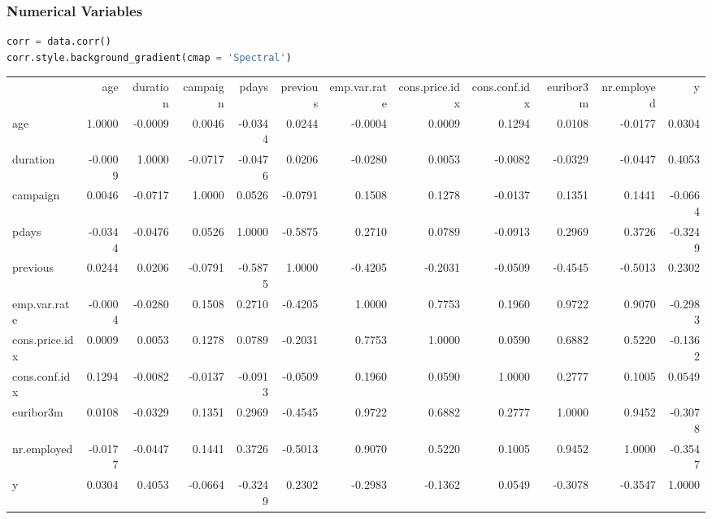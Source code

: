 \documentclass[11pt,a4paper]{article}
\begin{document}
    \subsubsection{Numerical Variables}
\begin{lstlisting}[language = Python]
corr = data.corr()
corr.style.background_gradient(cmap = 'Spectral')
\end{lstlisting}
    \noindent
    {\tiny
        \begin{tabular}{lrrrrrrrrrrr}
            {} &     age &  duration &  campaign &   pdays &  previous &  emp.var.rate &  cons.price.idx &  cons.conf.idx &  euribor3m &  nr.employed &       y \\
            
            age            &  1.0000 &   -0.0009 &    0.0046 & -0.0344 &    0.0244 &       -0.0004 &          0.0009 &         0.1294 &     0.0108 &      -0.0177 &  0.0304 \\
            duration       & -0.0009 &    1.0000 &   -0.0717 & -0.0476 &    0.0206 &       -0.0280 &          0.0053 &        -0.0082 &    -0.0329 &      -0.0447 &  0.4053 \\
            campaign       &  0.0046 &   -0.0717 &    1.0000 &  0.0526 &   -0.0791 &        0.1508 &          0.1278 &        -0.0137 &     0.1351 &       0.1441 & -0.0664 \\
            pdays          & -0.0344 &   -0.0476 &    0.0526 &  1.0000 &   -0.5875 &        0.2710 &          0.0789 &        -0.0913 &     0.2969 &       0.3726 & -0.3249 \\
            previous       &  0.0244 &    0.0206 &   -0.0791 & -0.5875 &    1.0000 &       -0.4205 &         -0.2031 &        -0.0509 &    -0.4545 &      -0.5013 &  0.2302 \\
            emp.var.rate   & -0.0004 &   -0.0280 &    0.1508 &  0.2710 &   -0.4205 &        1.0000 &          0.7753 &         0.1960 &     0.9722 &       0.9070 & -0.2983 \\
            cons.price.idx &  0.0009 &    0.0053 &    0.1278 &  0.0789 &   -0.2031 &        0.7753 &          1.0000 &         0.0590 &     0.6882 &       0.5220 & -0.1362 \\
            cons.conf.idx  &  0.1294 &   -0.0082 &   -0.0137 & -0.0913 &   -0.0509 &        0.1960 &          0.0590 &         1.0000 &     0.2777 &       0.1005 &  0.0549 \\
            euribor3m      &  0.0108 &   -0.0329 &    0.1351 &  0.2969 &   -0.4545 &        0.9722 &          0.6882 &         0.2777 &     1.0000 &       0.9452 & -0.3078 \\
            nr.employed    & -0.0177 &   -0.0447 &    0.1441 &  0.3726 &   -0.5013 &        0.9070 &          0.5220 &         0.1005 &     0.9452 &       1.0000 & -0.3547 \\
            y              &  0.0304 &    0.4053 &   -0.0664 & -0.3249 &    0.2302 &       -0.2983 &         -0.1362 &         0.0549 &    -0.3078 &      -0.3547 &  1.0000 \\
        \end{tabular}
    } \\ \\
\end{document}

